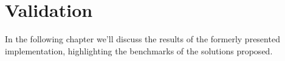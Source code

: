 \chapter{Validation}

In the following chapter we'll discuss the results of the formerly
presented implementation, highlighting the benchmarks of the solutions proposed.
